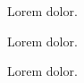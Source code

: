 


\tBeginVerbatim{}
Lorem  dolor.
\tEndVerbatim

\tBeginVerbatim{}
\clozehide

Lorem  dolor.
\tEndVerbatim

\tBeginVerbatim{}
\clozeshow

Lorem  dolor.
\tEndVerbatim

\tAll

\bye
